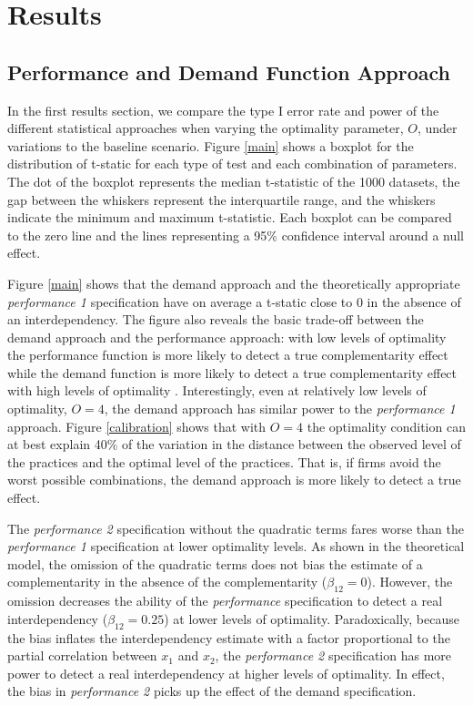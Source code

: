 \documentclass[12pt]{article}
\begin{document}
\section{Results}
\subsection{Performance and Demand Function
Approach}\label{performance-and-demand-function-approach}

In the first results section, we compare the type I error rate and power of the different statistical approaches when varying the optimality parameter, $O$, under variations to the baseline scenario. Figure \ref{main} shows a boxplot for the distribution of  t-static for each type of test and each combination of parameters. The dot of the boxplot represents the median t-statistic of the 1000 datasets, the gap between the whiskers represent the interquartile range, and the whiskers indicate the minimum and maximum t-statistic. Each boxplot can be compared to the zero line and the lines representing a 95\% confidence interval around a null effect.

Figure \ref{main} shows that the demand approach and the theoretically appropriate \emph{performance 1} specification have on average a t-static close to 0 in the absence of an interdependency. The figure also reveals the basic trade-off between the demand approach and the performance approach: with low levels of optimality the performance function is more likely to detect a true complementarity effect while the demand function is more likely to detect a true complementarity effect with high levels of optimality \citep{Grabner2013, Aral2012,Johansson2018}. Interestingly, even at relatively low levels of optimality, \(O = 4\), the demand approach has similar power to the \emph{performance 1} approach. Figure \ref{calibration} shows that with $O=4$ the optimality condition can at best explain 40\% of the variation in the distance between the observed level of the practices and the optimal level of the practices. That is, if firms avoid the worst possible combinations, the demand approach is more likely to detect a true effect.

The \emph{performance 2} specification without the quadratic terms fares worse than the \emph{performance 1} specification at lower optimality levels. As shown in the theoretical model, the omission of the quadratic terms does not bias the estimate of a complementarity in the absence of the complementarity ($\beta_{12} = 0$).  However, the omission decreases the ability of the \emph{performance} specification to detect a real interdependency ($\beta_{12} = 0.25$) at lower levels of optimality. Paradoxically, because the bias inflates the interdependency estimate with a factor proportional to the partial correlation between $x_1$ and $x_2$, the \emph{performance 2} specification has more power to detect a real interdependency at higher levels of optimality. In effect, the bias in \emph{performance 2} picks up the effect of the demand specification.
\end{document}
